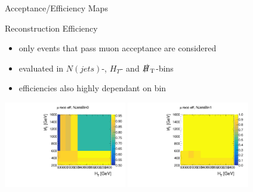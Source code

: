 \begin{frame}{Acceptance/Efficiency Maps}

\begin{block}{Reconstruction Efficiency}
\begin{itemize}
\item only events that pass muon acceptance are considered
\item evaluated in $N(\si{jets})$-, $H_{\si{T}}$- and $\slashed H_{\si{T}}$-bins
\item efficiencies also highly dependant on bin
\end{itemize}
\end{block}

\begin{center}
\includegraphics[width = 0.4\textwidth]{plots11/MuonRecoEff_NJetsBin0.pdf}
\includegraphics[width = 0.4\textwidth]{plots11/MuonRecoEff_NJetsBin1.pdf}
\end{center}

\end{frame}


